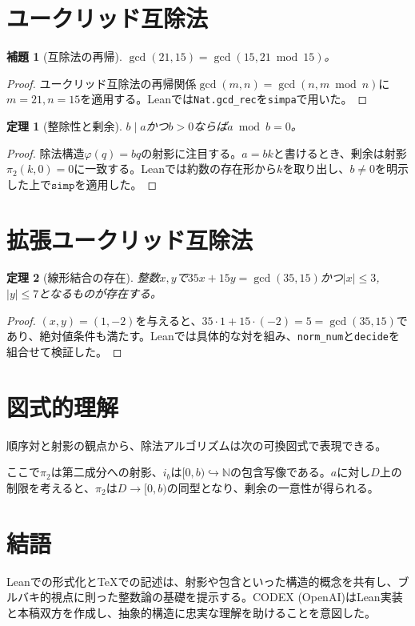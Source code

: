\documentclass[12pt]{article}
\theoremstyle{definition}
\theoremstyle{plain}
\newtheorem{theorem}{定理}
\newtheorem{lemma}{補題}
\begin{document}
\section{ユークリッド互除法}
\begin{lemma}[互除法の再帰]
$\gcd(21,15)=\gcd(15,21\bmod 15)$。
\end{lemma}
\begin{proof}
ユークリッド互除法の再帰関係$\gcd(m,n)=\gcd(n,m\bmod n)$に$m=21,n=15$を適用する。Leanでは\texttt{Nat.gcd\_rec}を\texttt{simpa}で用いた。
\end{proof}

\begin{theorem}[整除性と剰余]
$b\mid a$かつ$b>0$ならば$a\bmod b = 0$。
\end{theorem}
\begin{proof}
除法構造$\varphi(q) = bq$の射影に注目する。$a=bk$と書けるとき、剰余は射影$\pi_2(k,0)=0$に一致する。Leanでは約数の存在形から$k$を取り出し、$b\ne 0$を明示した上で$\texttt{simp}$を適用した。
\end{proof}

\section{拡張ユークリッド互除法}
\begin{theorem}[線形結合の存在]
整数$x,y$で$35x+15y = \gcd(35,15)$かつ$|x|\le 3$, $|y|\le 7$となるものが存在する。
\end{theorem}
\begin{proof}
$(x,y)=(1,-2)$を与えると、$35\cdot 1 + 15\cdot (-2) = 5 = \gcd(35,15)$であり、絶対値条件も満たす。Leanでは具体的な対を組み、\texttt{norm\_num}と\texttt{decide}を組合せて検証した。
\end{proof}

\section{図式的理解}
順序対と射影の観点から、除法アルゴリズムは次の可換図式で表現できる。
\begin{center}
\end{center}
ここで$\pi_2$は第二成分への射影、$i_b$は$[0,b)\hookrightarrow\mathbb{N}$の包含写像である。$a$に対し$D$上の制限を考えると、$\pi_2$は$D\to [0,b)$の同型となり、剰余の一意性が得られる。

\section*{結語}
Leanでの形式化とTeXでの記述は、射影や包含といった構造的概念を共有し、ブルバキ的視点に則った整数論の基礎を提示する。CODEX (OpenAI)はLean実装と本稿双方を作成し、抽象的構造に忠実な理解を助けることを意図した。
\end{document}
